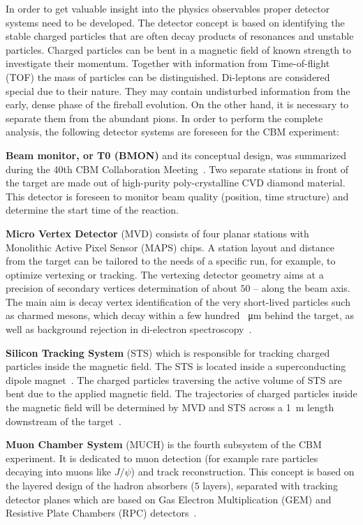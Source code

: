 In order to get valuable insight into the physics observables proper detector systems need to be developed. The detector concept is based on identifying the stable charged particles that are often decay products of resonances and unstable particles. Charged particles can be bent in a magnetic field of known strength to investigate their momentum. Together with information from Time-of-flight (\gls{TOF}) the mass of particles can be distinguished. Di-leptons are considered special due to their nature. They may contain undisturbed information from the early, dense phase of the fireball evolution. On the other hand, it is necessary to separate them from the abundant pions. In order to perform the complete analysis, the following detector systems are foreseen for the \gls{CBM} experiment:\bigbreak


\textbf{Beam monitor, or T0 (\gls{BMON})} and its conceptual design, was summarized during the 40th \gls{CBM} Collaboration Meeting~\cite{bmon}. Two separate stations in front of the target are made out of high-purity poly-crystalline CVD diamond material. This detector is foreseen to monitor beam quality (position, time structure) and determine the start time of the reaction.\bigbreak

\textbf{Micro Vertex Detector} (\gls{MVD}) consists of four planar stations with Monolithic Active Pixel Sensor (\gls{MAPS}) chips. A station layout and distance from the target can be tailored to the needs of a specific run, for example, to optimize vertexing or tracking. The vertexing detector geometry aims at a precision of secondary vertices determination of about $50$ --  along the beam axis. The main aim is decay vertex identification of the very short-lived particles such as charmed mesons, which decay within a few hundred \SI{}{\micro\metre} behind the target, as well as background rejection in di-electron spectroscopy~\cite{MVD}.\bigbreak

 \textbf{Silicon Tracking System} (\gls{STS}) which is responsible for tracking charged particles inside the magnetic field. The \gls{STS} is located inside a superconducting dipole magnet~\cite{Malakhov:109025}. The charged particles traversing the active volume of \gls{STS} are bent due to the applied magnetic field. The trajectories of charged particles inside the magnetic field will be determined by MVD and STS across a \SI{1}{\metre} length downstream of the target~\cite{Heuser:54798}.\bigbreak
 
\textbf{Muon Chamber System} (\gls{MUCH}) is the fourth subsystem of the \gls{CBM} experiment. It is dedicated to muon detection (for example rare particles decaying into muons like $J/\psi$) and track reconstruction. This concept is based on the layered design of the hadron absorbers ($5$ layers), separated with tracking detector planes which are based on Gas Electron Multiplication (\gls{GEM}) and Resistive Plate Chambers (\gls{RPC}) detectors~\cite{MUCH}.\bigbreak

